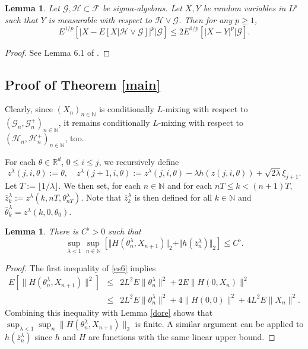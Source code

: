 \documentclass[a4paper]{article}
\newtheorem{lemma}[theorem]{Lemma}
\begin{document}
\begin{lemma}\label{mall} Let 
$\mathcal{G},\mathcal{H}\subset\mathcal{F}$
	be sigma-algebras. Let $X,Y$ be random variables in $L^p$ such that $Y$ is measurable with
	respect to $\mathcal{H}\vee\mathcal{G}$.
	Then for any $p\ge 1$,
	$$
	E^{1/p}\left[\vert X-E[X\vert\mathcal{H}\vee\mathcal{G}]\vert^p\big\vert \mathcal{G}\right]
	\leq 2E^{1/p}\left[\vert X-Y\vert^p\big\vert \mathcal{G}\right].
	$$
\end{lemma}
\begin{proof} See Lemma 6.1 of \cite{4}.
\end{proof}

\subsection{Proof of Theorem \ref{main}}\label{sec_proof_main}

Clearly, since
$(X_n)_{n \in \mathbb{N}}$ is conditionally $L$-mixing with respect to
$(\mathcal{G}_n,\mathcal{G}^+_n)_{n \in \mathbb{N}}$, it remains
conditionally $L$-mixing with respect to
$(\mathcal{H}_n,\mathcal{H}^+_n)_{n \in \mathbb{N}}$, too.

For each $\theta\in\mathbb{R}^{d}$, $0\leq i\leq j$, we recursively define
$$
z^{\lambda}(j,i,\theta):=\theta,\quad z^{\lambda}(j+1,i,\theta):=z^{\lambda}(j,i,\theta)
-\lambda h(z(j,i,\theta))+\sqrt{2\lambda}\xi_{j+1}.
$$
Let $T:=\lfloor 1/\lambda\rfloor$. We then set, for each $n\in\mathbb{N}$ and for each
$nT\leq k<(n+1)T$, $\overline{z}_k^{\lambda}:=z^{\lambda}(k,nT,\theta^{\lambda}_{nT})$.
Note that $\overline{z}^{\lambda}_k$ is then defined for all $k\in\mathbb{N}$
and $\overline{\theta}^{\lambda}_k=z^{\lambda}(k,0,\theta_0)$.

\begin{lemma}\label{easy}
	There is $C^{\flat}>0$ such that
	$$
\sup_{\lambda<1}\sup_{n\in\mathbb{N}} \left[\Vert H(\theta^{\lambda}_n,X_{n+1}) \Vert_2+ \Vert h(\overline{z}_n^{\lambda})\Vert_2\right]\leq C^{\flat}.
	$$
\end{lemma}
\begin{proof}
The first inequality of \eqref{es6} implies
	\begin{eqnarray*}
	E\left[\|H(\theta^{\lambda}_n,X_{n+1})\|^2  \right] &\le& 2 L^2 E\| \theta^{\lambda}_n \|^2 + 2 E \| H(0, X_n) \|^2 \\
	&\le& 2L^2E\|\theta^{\lambda}_n\|^2 + 4 \| H(0,0)\|^2	 + 4 L^2 E \|X_n\|^2.
	\end{eqnarray*}
Combining this inequality with Lemma \ref{dore} shows that $\sup_{\lambda<1}\sup_{n} \|H(\theta^{\lambda}_n,X_{n+1})\|_2 $ is finite.
A similar argument can be applied to $h(\overline{z}_n^{\lambda})$ since $h$ and $H$ are functions with the same linear upper bound. 
\end{proof}
\end{document}
